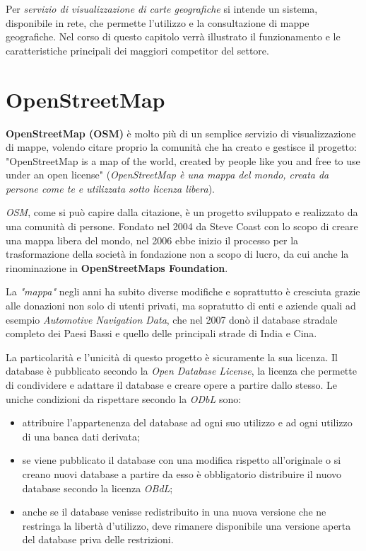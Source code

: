 Per \textit{servizio di visualizzazione di carte geografiche} si intende un sistema, disponibile in rete, che permette l'utilizzo e la consultazione di mappe geografiche. Nel corso di questo capitolo verrà illustrato il funzionamento e le caratteristiche principali dei maggiori competitor del settore.

\section{OpenStreetMap}

\textbf{OpenStreetMap (OSM)} è molto più di un semplice servizio di visualizzazione di mappe, volendo citare proprio la comunità che ha creato e gestisce il progetto: "OpenStreetMap is a map of the world, created by people like you and free to use under an open license" (\textit{OpenStreetMap è una mappa del mondo, creata da persone come te e utilizzata sotto licenza libera}).\cite{OSM}


\textit{OSM}, come si può capire dalla citazione, è un progetto sviluppato e realizzato da una comunità di persone. Fondato nel 2004 da Steve Coast con lo scopo di creare una mappa libera del mondo, nel 2006 ebbe inizio il processo per la trasformazione della società in fondazione non a scopo di lucro, da cui anche la rinominazione in \textbf{OpenStreetMaps Foundation}.

La \textit{"mappa"} negli anni ha subito diverse modifiche e soprattutto è cresciuta grazie alle donazioni non solo di utenti privati, ma sopratutto di enti e aziende quali ad esempio \textit{Automotive Navigation Data}, che nel 2007 donò il database stradale completo dei Paesi Bassi e quello delle principali strade di India e Cina.

La particolarità e l'unicità di questo progetto è sicuramente la sua licenza. Il database è pubblicato secondo la \textit{Open Database License}, la licenza che permette di condividere e adattare il database e creare opere a partire dallo stesso. Le uniche condizioni da rispettare secondo la \textit{ODbL} sono:
\begin{itemize}
\item attribuire l'appartenenza del database ad ogni suo utilizzo e ad ogni utilizzo di una banca dati derivata;
\item se viene pubblicato il database con una modifica rispetto all'originale o si creano nuovi database a partire da esso è obbligatorio distribuire il nuovo database secondo la licenza \textit{OBdL};
\item anche se il database venisse redistribuito in una nuova versione che ne restringa la libertà d'utilizzo, deve rimanere disponibile una versione aperta del database priva delle restrizioni.
\end{itemize}

